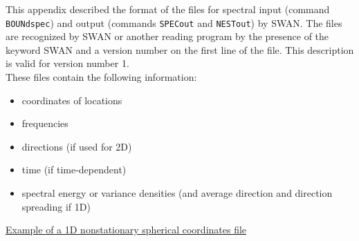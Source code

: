 \documentclass[12pt]{book}
\begin{document}
 \label{app:spcform}

This appendix described the format of the files for spectral input (command {\tt BOUNdspec}) and output
(commands {\tt SPECout} and {\tt NESTout}) by SWAN. The files are recognized by SWAN or another reading program
by the presence of the keyword SWAN and a version number on the first line of the file. This description
is valid for version number 1.
\\[2ex]
\noindent
These files contain the following information:
\begin{itemize}
  \item coordinates of locations
  \item frequencies
  \item directions (if used for 2D)
  \item time (if time-dependent)
  \item spectral energy or variance densities (and average direction and direction spreading if 1D)
\end{itemize}

\noindent
\underline{Example of a 1D nonstationary spherical coordinates file}
\end{document}
